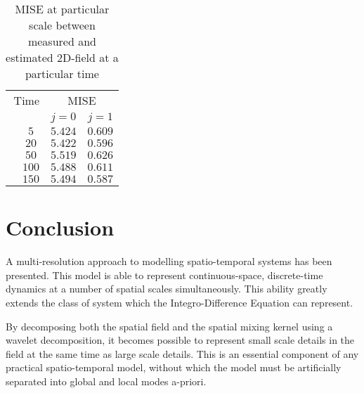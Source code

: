 \documentclass[11pt,draftcls,onecolumn,peerreview]{IEEEtran}
\begin{document}
{{%
\begin{table}[!h]
\renewcommand{\arraystretch}{1.3}
\caption {MISE  at particular scale between measured and estimated 2D-field  at a particular time}
\label{table:ValidationResultField}
\centering
\begin{tabular}{cccc}
\hline \hline
\multicolumn{2}{r}{Time}&\multicolumn{2}{c}{MISE} \\
\cline{3-4}
&&$j=0$&$j=1$ \\ 
\hline 
&$5$ &$5.424$&$0.609$ \\
&$20$ &$5.422$&$0.596$ \\
&$50$ &$5.519$&$0.626$ \\
&$100$ &$5.488$&$0.611$ \\
&$150$ &$5.494$&$0.587$ \\
\hline \hline
\end{tabular}
\end {table}
\section{Conclusion}
A multi-resolution approach to modelling spatio-temporal systems has been presented. This model is able to represent continuous-space, discrete-time dynamics at a number of spatial scales simultaneously. This ability greatly extends the class of system which the Integro-Difference Equation can represent.


By decomposing both the spatial field and the spatial mixing kernel using a wavelet decomposition, it becomes possible to represent small scale details in the field at the same time as large scale details. This is an essential component of any practical spatio-temporal model, without which the model must be artificially separated into global and local modes a-priori.


}}
\end{document}
